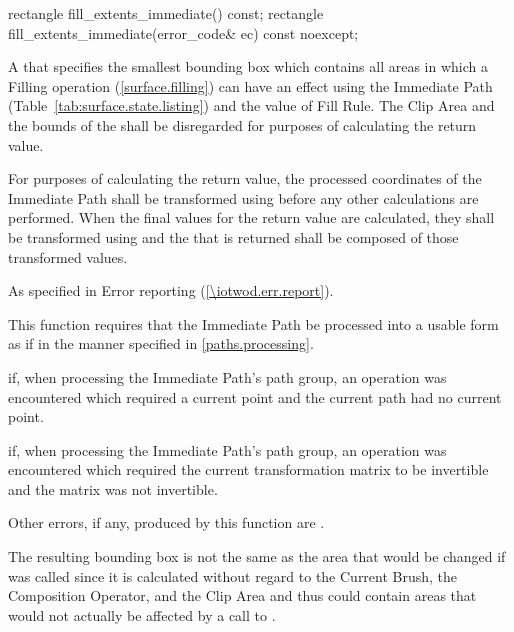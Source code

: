 \begin{itemdecl}
rectangle fill_extents_immediate() const;
rectangle fill_extents_immediate(error_code& ec) const noexcept;
\end{itemdecl}
\begin{itemdescr}
\pnum
\returns
A  that specifies the smallest bounding box which contains all areas in which a Filling operation (\ref{surface.filling}) can have an effect using the Immediate Path (Table~\ref{tab:surface.state.listing}) and the value of Fill Rule. The Clip Area and the bounds of the \underlyingsurface shall be disregarded for purposes of calculating the return value.

\pnum
For purposes of calculating the return value, the processed coordinates of the Immediate Path shall be transformed using  before any other calculations are performed. When the final values for the return value are calculated, they shall be transformed using  and the  that is returned shall be composed of those transformed values.

\pnum
\throws
As specified in Error reporting (\ref{\iotwod.err.report}).

\pnum
\remarks
This function requires that the Immediate Path be processed into a usable form as if in the manner specified in \ref{paths.processing}.

\pnum
\errors
{} if, when processing the Immediate Path's path group, an operation was encountered which required a current point and the current path had no current point.

\pnum
{} if, when processing the Immediate Path's path group, an operation was encountered which required the current transformation matrix to be invertible and the matrix was not invertible.

\pnum
Other errors, if any, produced by this function are .

\pnum
\realnotes
The resulting bounding box is not the same as the area that would be changed if  was called since it is calculated without regard to the Current Brush, the Composition Operator, and the Clip Area and thus could contain areas that would not actually be affected by a call to .
\end{itemdescr}

